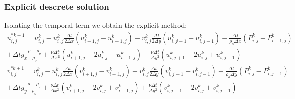 \documentclass[xcolor=dvipsnames,10pt,aspectratio=169]{beamer}
\begin{document}
\begin{frame}
	\frametitle{Explicit descrete solution}
	Isolating the temporal term we obtain the explicit method:
	\begin{equation}
		\begin{split}
		u_{i , j}^{\ast k + 1} = u_{i , j}^{k} - u_{i , j}^{k}\frac{\Delta t}{2 \Delta x} \left( u_{i + 1 , j}^k - u_{i - 1 , j}^k  \right) - v_{i , j}^{k}\frac{\Delta t }{2 \Delta y} \left(u_{i , j+ 1}^k - u_{i, j-1}^k \right)  -\frac{\Delta t}{\rho_o \Delta x} \left(P_{i, j}^k - P_{i - 1 , j}^k\right)\\ + \Delta t  g_x  \frac{\rho - \rho_o}{\rho_o} + \frac{\nu \Delta t}{\Delta x^2} \left( u_{i+1 , j}^{k} - 2 u_{i,j}^{k} + u_{i-1,j}^{k} \right) + \frac{\nu \Delta t}{\Delta y^2} \left(u_{i , j+1}^{k} - 2 u_{i,j}^{k} + u_{i,j-1}^{k}\right)
		\end{split}
	\end{equation}
	\begin{equation}
		\begin{split}
		v_{i , j}^{\ast k + 1} = v_{i , j}^{k} -u_{i , j}^{k}\frac{\Delta t}{2 \Delta x} \left(v_{i + 1 , j}^k - v_{i - 1 , j}^k\right) - v_{i , j}^{k} \frac{\Delta t}{2 \Delta y} \left(v_{i , j+ 1}^k - v_{i, j-1}^k  \right) -\frac{\Delta t}{\rho_o \Delta y} \left(P_{i , j}^k - P_{i , j - 1}^k\right) \\ + \Delta t g_y  \frac{\rho - \rho_o}{\rho_o} + \frac{\nu \Delta t}{\Delta x^2} \left( v_{i+1 , j}^{k} - 2 v_{i,j}^{k} + v_{i-1,j}^{k} \right) + \frac{\nu \Delta t}{\Delta y^2} \left( v_{i , j+1}^{k} - 2 v_{i,j}^{k} + v_{i,j-1}^{k} \right)
		\end{split}
	\end{equation}
\end{frame}
\end{document}
